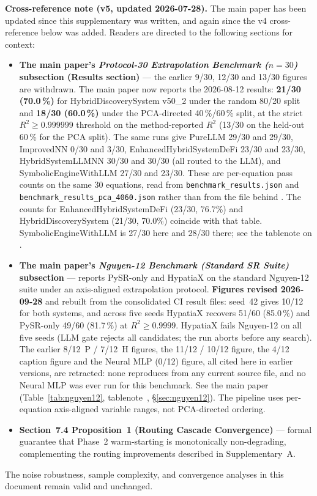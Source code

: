 \documentclass[twoside,11pt]{article}
\newcommand{\Rsq}{R^{2}}
\begin{document}
\medskip
\noindent\textbf{Cross-reference note (v5, updated 2026-07-28).}
The main paper has been updated since this supplementary was written, and
again since the v4 cross-reference below was added. Readers are directed
to the following sections for context:
\begin{itemize}
  \item \textbf{The main paper's \emph{Protocol-30 Extrapolation Benchmark ($n=30$)} subsection (Results section)} --- the
    earlier 9/30, 12/30 and 13/30 figures are withdrawn. The main paper now
    reports the 2026-08-12 results: \textbf{21/30 (70.0\,\%)} for
    HybridDiscoverySystem v50\_2 under the random 80/20 split and
    \textbf{18/30 (60.0\,\%)} under the PCA-directed 40\,\%/60\,\% split, at
    the strict $\Rsq \geq 0.999999$ threshold on the method-reported $\Rsq$ (13/30 on the
    held-out 60\,\% for the PCA split). The same
    runs give PureLLM 29/30 and 29/30, ImprovedNN 0/30 and 3/30,
    EnhancedHybridSystemDeFi 23/30 and 23/30, HybridSystemLLMNN 30/30 and
    30/30 (all routed to the LLM), and SymbolicEngineWithLLM 27/30 and 23/30.
    These are per-equation pass counts on the same 30 equations, read from
    \texttt{benchmark\_results.json} and \texttt{benchmark\_results\_pca\_4060.json}
    rather than from the file behind . The counts for
    EnhancedHybridSystemDeFi (23/30, 76.7\%) and HybridDiscoverySystem
    (21/30, 70.0\%) coincide with that table. SymbolicEngineWithLLM is 27/30
    here and 28/30 there; see the tablenote on .
  \item \textbf{The main paper's \emph{Nguyen-12 Benchmark (Standard SR Suite)} subsection} --- reports
    PySR-only and HypatiaX on the standard Nguyen-12 suite under an axis-aligned
    extrapolation protocol. \textbf{Figures revised 2026-09-28} and rebuilt from
    the consolidated CI result files: seed~42 gives 10/12 for both systems, and
    across five seeds HypatiaX recovers 51/60 (85.0\,\%) and PySR-only 49/60
    (81.7\,\%) at $\Rsq\ge0.9999$. HypatiaX fails Nguyen-12 on all five seeds
    (LLM gate rejects all candidates; the run aborts before any search).
    The earlier 8/12~P / 7/12~H figures, the 11/12 / 10/12 figure, the
    4/12 caption figure and the Neural MLP (0/12) figure, all cited here in
    earlier versions, are retracted: none reproduces from any current source
    file, and no Neural MLP was ever run for this benchmark. See the main paper
    (Table~\ref{tab:nguyen12}, tablenote~\ddag, \S\ref{sec:nguyen12}). The
    pipeline uses per-equation axis-aligned variable ranges, not PCA-directed
    ordering.
  \item \textbf{Section~7.4 Proposition~1 (Routing Cascade Convergence)} --- formal
    guarantee that Phase~2 warm-starting is monotonically non-degrading,
    complementing the routing improvements described in Supplementary~A.
\end{itemize}
The noise robustness, sample complexity, and convergence analyses in this
document remain valid and unchanged.
\end{document}
